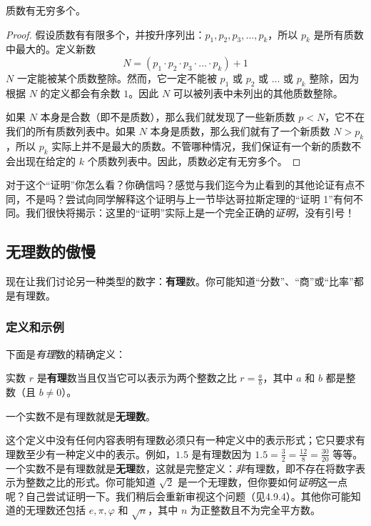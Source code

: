 \begin{theorem}[质数无限性]
    质数有无穷多个。
\end{theorem}

\begin{proof}
    假设质数有有限多个，并按升序列出：$p_1, p_2, p_3, \dots, p_k$，所以 $p_k$ 是所有质数中最大的。定义新数
    \[N = (p_1 \cdot p_2 \cdot p_3 \cdot \dots \cdot p_k) + 1\]
    $N$ 一定能被某个质数整除。然而，它一定不能被 $p_1$ 或 $p_2$ 或 $\dots$ 或 $p_k$ 整除，因为根据 $N$ 的定义都会有余数 $1$。因此 $N$ 可以被列表中未列出的其他质数整除。

    如果 $N$ 本身是合数（即不是质数），那么我们就发现了一些新质数 $p < N$，它不在我们的所有质数列表中。如果 $N$ 本身是质数，那么我们就有了一个新质数 $N > p_k$，所以 $p_k$ 实际上并不是最大的质数。不管哪种情况，我们保证有一个新的质数不会出现在给定的 $k$ 个质数列表中。因此，质数必定有无穷多个。
\end{proof}

对于这个“证明”你怎么看？你确信吗？感觉与我们迄今为止看到的其他论证有点不同，不是吗？尝试向同学解释这个证明与上一节毕达哥拉斯定理的“证明 1”有何不同。我们很快将揭示：这里的“证明”实际上是一个完全正确的\textit{证明}，没有引号！
    
\subsection{无理数的傲慢}

现在让我们讨论另一种类型的数字：\textbf{有理}数。你可能知道“分数”、“商”或“比率”都是有理数。

\subsubsection*{定义和示例}

下面是\textit{有理}数的精确定义：

\begin{definition}
    实数 $r$ 是\textbf{有理}数当且仅当它可以表示为两个整数之比 $r = \frac{a}{b}$，其中 $a$ 和 $b$ 都是整数（且 $b \ne 0$）。

    一个实数不是有理数就是\textbf{无理数}。
\end{definition}

这个定义中没有任何内容表明有理数必须只有一种定义中的表示形式；它只要求有理数至少有一种定义中的表示。例如，$1.5$ 是有理数因为 $1.5 = \frac{3}{2} = \frac{12}{8} = \frac{30}{20}$ 等等。一个实数不是有理数就是\textbf{无理}数，这就是完整定义：\textit{非}有理数，即不存在将数字表示为整数之比的形式。你可能知道 $\sqrt{2}$ 是一个无理数，但你要如何\textit{证明}这一点呢？自己尝试证明一下。我们稍后会重新审视这个问题（见4.9.4）。其他你可能知道的无理数还包括 $e, \pi, \varphi$ 和 $\sqrt{n}$，其中 $n$ 为正整数且不为完全平方数。


